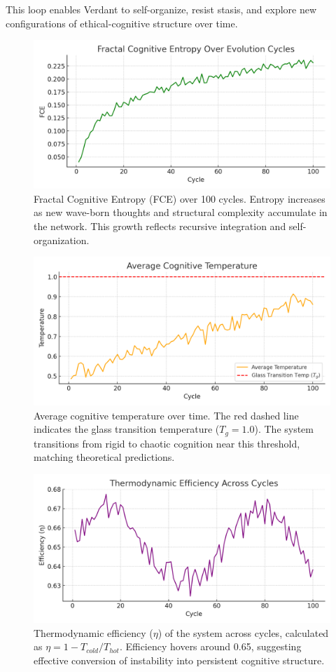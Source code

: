 \documentclass{article}
\begin{document}
This loop enables Verdant to self-organize, resist stasis, and explore new configurations of ethical-cognitive structure over time.




\begin{figure}[!htbp]
\centering
\includegraphics[width=0.85\linewidth]{figures/fce_growth.png}
\caption{Fractal Cognitive Entropy (FCE) over 100 cycles. Entropy increases as new wave-born thoughts and structural complexity accumulate in the network. This growth reflects recursive integration and self-organization.}
\label{fig:fce_growth}
\end{figure}

\begin{figure}[!htbp]
\centering
\includegraphics[width=0.85\linewidth]{figures/phase_diagram.png}
\caption{Average cognitive temperature over time. The red dashed line indicates the glass transition temperature ($T_g = 1.0$). The system transitions from rigid to chaotic cognition near this threshold, matching theoretical predictions.}
\label{fig:phase_diagram}
\end{figure}

\begin{figure}[!htpb]
\centering
\includegraphics[width=0.85\linewidth]{figures/thermodynamic_efficiency.png}
\caption{Thermodynamic efficiency ($\eta$) of the system across cycles, calculated as $\eta = 1 - T_{cold} / T_{hot}$. Efficiency hovers around 0.65, suggesting effective conversion of instability into persistent cognitive structure.}
\label{fig:efficiency}
\end{figure}
\end{document}
